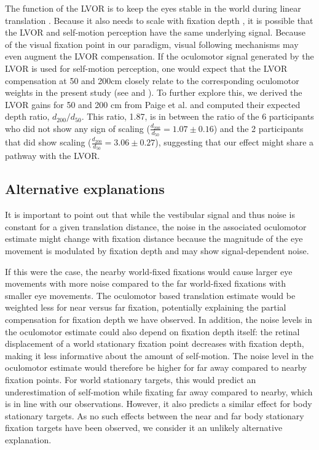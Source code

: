 The function of the LVOR is to keep the eyes stable in the world during linear translation \cite{paige1989,busettini1994,paige1998}. Because it also needs to scale with fixation depth \cite{angelaki2004}, it is possible that the LVOR and self-motion perception have the same underlying signal. Because of the visual fixation point in our paradigm, visual following mechanisms may even augment the LVOR compensation. If the oculomotor signal generated by the LVOR is used for self-motion perception, one would expect that the LVOR compensation at 50 and 200cm closely relate to the corresponding oculomotor weights in the present study (see  and ). To further explore this, we derived the LVOR gains for 50 and 200 \si{\centi\metre} from Paige et al. \citeyear{paige1989} and computed their expected depth ratio, $d_{200} / d_{50}$. This ratio, 1.87, is in between the ratio of the 6 participants who did not show any sign of scaling ($\frac{d_{200}}{d_{50}} = 1.07 \pm 0.16$) and the 2 participants that did show scaling ($\frac{d_{200}}{d_{50}} = 3.06 \pm 0.27$), suggesting that our effect might share a pathway with the LVOR.


\subsection{Alternative explanations}

It is important to point out that while the vestibular signal and thus noise is constant for a given translation distance, the noise in the associated oculomotor estimate might change with fixation distance because the magnitude of the eye movement is modulated by fixation depth and may show signal-dependent noise.

If this were the case, the nearby world-fixed fixations would cause larger eye movements with more noise compared to the far world-fixed fixations with smaller eye movements. The oculomotor based translation estimate would be weighted less for near versus far fixation, potentially explaining the partial compensation for fixation depth we have observed. In addition, the noise levels in the oculomotor estimate could also depend on fixation depth itself: the retinal displacement of a world stationary fixation point decreases with fixation depth, making it less informative about the amount of self-motion. The noise level in the oculomotor estimate would therefore be higher for far away compared to nearby fixation points. For world stationary targets, this would predict an underestimation of self-motion while fixating far away compared to nearby, which is in line with our observations. However, it also predicts a similar effect for body stationary targets. As no such effects between the near and far body stationary fixation targets have been observed, we consider it an unlikely alternative explanation.

